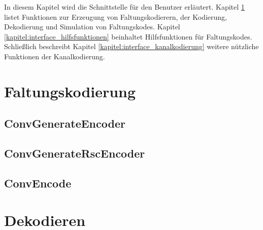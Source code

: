 
In diesem Kapitel wird die Schnittstelle für den Benutzer erläutert. Kapitel \ref{kapitel:interface_faltungskodierung} listet Funktionen zur Erzeugung von Faltungskodierern, der Kodierung, Dekodierung und Simulation von Faltungskodes. Kapitel \ref{kapitel:interface_hilfsfunktionen} beinhaltet Hilfsfunktionen für Faltungskodes. Schließlich beschreibt Kapitel \ref{kapitel:interface_kanalkodierung} weitere nützliche Funktionen der Kanalkodierung.

\section{Faltungskodierung}
\label{kapitel:interface_faltungskodierung}

\subsection{ConvGenerateEncoder}


\subsection{ConvGenerateRscEncoder}


\subsection{ConvEncode}


\section{Dekodieren}
\label{kapitel:interface_dekodieren}

